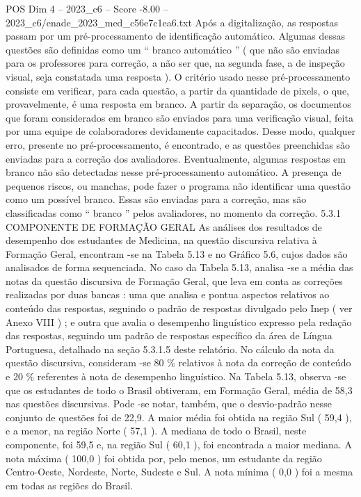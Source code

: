 \begin{textsample}{POS Dim 4 – 2023\_c6 – Score -8.00 – 2023\_c6/enade\_2023\_med\_c56e7c1ea6.txt}
Após a digitalização, as respostas passam por um pré-processamento de identificação automático.
Algumas dessas questões são definidas como um “ branco automático ” ( que não são enviadas para os professores para correção, a não ser que, na segunda fase, a de inspeção visual, seja constatada uma resposta ).
O critério usado nesse pré-processamento consiste em verificar, para cada questão, a partir da quantidade de pixels, o que, provavelmente, é uma resposta em branco.
A partir da separação, os documentos que foram considerados em branco são enviados para uma verificação visual, feita por uma equipe de colaboradores devidamente capacitados.
Desse modo, qualquer erro, presente no pré-processamento, é encontrado, e as questões preenchidas são enviadas para a correção dos avaliadores.
Eventualmente, algumas respostas em branco não são detectadas nesse pré-processamento automático.
A presença de pequenos riscos, ou manchas, pode fazer o programa não identificar uma questão como um possível branco.
Essas são enviadas para a correção, mas são classificadas como “ branco ” pelos avaliadores, no momento da correção. 5.3.1 COMPONENTE DE FORMAÇÃO GERAL As análises dos resultados de desempenho dos estudantes de Medicina, na questão discursiva relativa à Formação Geral, encontram -se na Tabela 5.13 e no Gráfico 5.6, cujos dados são analisados de forma sequenciada.
No caso da Tabela 5.13, analisa -se a média das notas da questão discursiva de Formação Geral, que leva em conta as correções realizadas por duas bancas : uma que analisa e pontua aspectos relativos ao conteúdo das respostas, seguindo o padrão de respostas divulgado pelo Inep ( ver Anexo VIII ) ; e outra que avalia o desempenho linguístico expresso pela redação das respostas, seguindo um padrão de respostas específico da área de Língua Portuguesa, detalhado na seção 5.3.1.5 deste relatório.
No cálculo da nota da questão discursiva, consideram -se 80 \% relativos à nota da correção de conteúdo e 20 \% referentes à nota de desempenho linguístico.
Na Tabela 5.13, observa -se que os estudantes de todo o Brasil obtiveram, em Formação Geral, média de 58,3 nas questões discursivas.
Pode -se notar, também, que o desvio-padrão nesse conjunto de questões foi de 22,9.
A maior média foi obtida na região Sul ( 59,4 ), e a menor, na região Norte ( 57,1 ).
A mediana de todo o Brasil, neste componente, foi 59,5 e, na região Sul ( 60,1 ), foi encontrada a maior mediana.
A nota máxima ( 100,0 ) foi obtida por, pelo menos, um estudante da região Centro-Oeste, Nordeste, Norte, Sudeste e Sul.
A nota mínima ( 0,0 ) foi a mesma em todas as regiões do Brasil.

\end{textsample}
